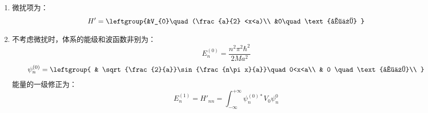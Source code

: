 \subsection{ }
\begin{enumerate}
\item 微扰项为：
\begin{equation}
H'=\leftgroup{&V_{0}\quad (\frac{a}{2} <x<a)\\
&0\quad \text{其他}
}
\end{equation}
\item 不考虑微扰时，体系的能级和波函数非别为：
\begin{equation}
E^{(0)}_{n}=\frac{n^2 \pi^2 \hbar^2}{2Ma^2}
\end{equation}
\begin{equation}
\psi^{(0)}_{n}=\leftgroup{
    & \sqrt{\frac{2}{a}}\sin{\frac{n\pi x}{a}}\quad 0<x<a\\
    & 0 \quad \text{其他}\\
}
\end{equation}
能量的一级修正为：
\begin{equation}
E^{(1)}_{n}=H'_{nn}=\int^{+\infty}_{-\infty} \psi^{(0)*}_{n}V_{0}\psi^{0}_{n}
\end{equation}
\end{enumerate}